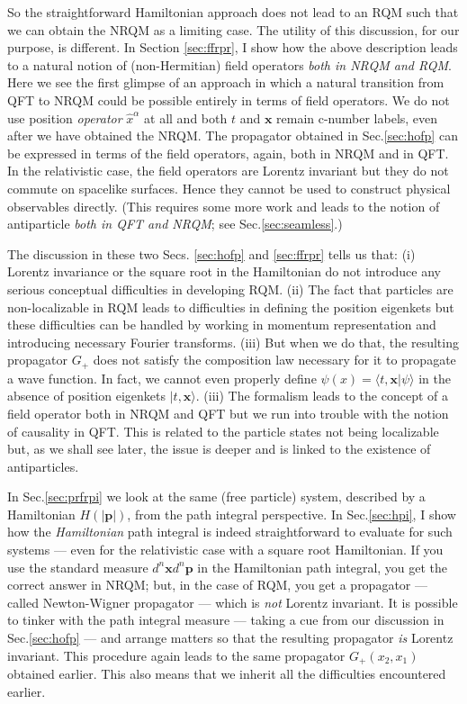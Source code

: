 \documentclass{article}
\def\ket#1{|#1\rangle}                    %
\def\amp#1#2{\langle #1 | #2\rangle}      %
\begin{document}
So the straightforward Hamiltonian approach does not lead to an RQM such that we can obtain the NRQM as a limiting case. The utility of this discussion, for our purpose, is different. In
 Section \ref{sec:ffrpr}, I show how the above description leads to a natural notion of (non-Hermitian) field operators \textit{both in NRQM and RQM}. Here we see the first glimpse of an approach in which a  natural transition  from QFT to NRQM could be possible entirely in terms of field operators. We do not use position \textit{operator} $\hat x^\alpha$ at all and both $t$ and $\bm{x}$ remain c-number labels, even after we have obtained the NRQM. The propagator obtained in Sec.\ref{sec:hofp} can be expressed in terms of the field operators, again,  both in NRQM and in QFT. In the relativistic case, the field operators are Lorentz invariant but they do not commute on spacelike surfaces. Hence they cannot be used to construct physical observables directly. (This requires some more work  and leads to  the notion of antiparticle \textit{both in QFT and NRQM};  see Sec.\ref{sec:seamless}.) 
 
 The discussion in these two Secs. \ref{sec:hofp} and \ref{sec:ffrpr} tells us that: (i) Lorentz invariance or the square root in the Hamiltonian do not introduce any serious conceptual difficulties in developing RQM. (ii) The fact that particles are non-localizable in RQM leads to difficulties in defining the position eigenkets but these difficulties can be handled by working in momentum representation and introducing necessary Fourier transforms. (iii) But when we do that, the resulting propagator $G_+$ does not satisfy the composition law necessary for it to propagate a wave function. In fact, we cannot even properly define $\psi(x)=\amp{t,\bm{x}}{\psi}$ in the absence of position eigenkets $\ket{t,\bm{x}}$. (iii) The formalism leads to the concept of a field operator  both in NRQM and QFT but we run into trouble with the notion of causality in QFT. This is related to the particle states not being localizable but, as we shall see later, the issue is deeper and is linked to the existence of antiparticles. 
 
 In Sec.\ref{sec:prfrpi} we look at the  same (free particle) system, described by a Hamiltonian $H(|\bm{p}|)$, from the path integral perspective. In Sec.\ref{sec:hpi}, I show how the \textit{Hamiltonian} path integral is indeed straightforward to evaluate for such systems --- even for the relativistic case with a square root Hamiltonian.  If you use the standard measure $d^n\bm{x} d^n\bm{p}$ in the Hamiltonian path integral, you get the correct answer in NRQM; but, in the case of RQM, you get a propagator --- called Newton-Wigner propagator --- which is \textit{not} Lorentz invariant.  It is possible to tinker with the path integral measure --- taking a cue from our discussion in Sec.\ref{sec:hofp} --- and arrange matters so that the resulting propagator \textit{is} Lorentz invariant. This procedure again leads to the same propagator $G_+(x_2,x_1)$ obtained earlier. This  also means that we inherit all the difficulties encountered earlier. 
 
\end{document}
